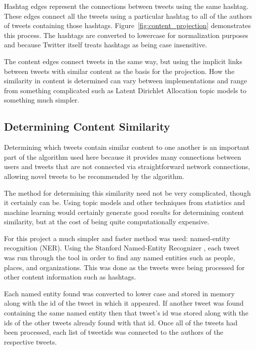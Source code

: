 Hashtag edges represent the connections between tweets using the same hashtag. These edges connect all the tweets using a particular hashtag to all of the authors of tweets containing those hashtags. Figure~\ref{fig:content_projection} demonstrates this process. The hashtags are converted to lowercase for normalization purposes and because Twitter itself treats hashtags as being case insensitive.

The content edges connect tweets in the same way, but using the implicit links between tweets with similar content as the basis for the projection. How the similarity in content is determined can vary between implementations and range from something complicated such as Latent Dirichlet Allocation topic models to something much simpler.

\subsection{Determining Content Similarity}
\label{sec:DeterminingContentSimilarity}

Determining which tweets contain similar content to one another is an important part of the algorithm used here because it provides many connections between users and tweets that are not connected via straightforward network connections, allowing novel tweets to be recommended by the algorithm.

The method for determining this similarity need not be very complicated, though it certainly can be. Using topic models and other techniques from statistics and machine learning would certainly generate good results for determining content similarity, but at the cost of being quite computationally expensive.

For this project a much simpler and faster method was used: named-entity recognition (NER). Using the Stanford Named-Entity Recognizer \cite{StanfordNER2011}, each tweet was run through the tool in order to find any named entities such as people, places, and organizations. This was done as the tweets were being processed for other content information such as hashtags.

Each named entity found was converted to lower case and stored in memory along with the id of the tweet in which it appeared. If another tweet was found containing the same named entity then that tweet's id was stored along with the ids of the other tweets already found with that id. Once all of the tweets had been processed, each list of tweetids was connected to the authors of the respective tweets.

